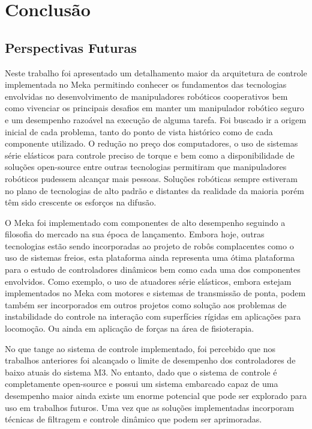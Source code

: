 \chapter{Conclusão} \label{ch:conclusoes}


\section{Perspectivas Futuras}

Neste trabalho foi apresentado um detalhamento maior da arquitetura de controle implementada no Meka permitindo conhecer os fundamentos das tecnologias envolvidas no desenvolvimento de manipuladores robóticos cooperativos bem como vivenciar os principais desafios em manter um manipulador robótico seguro e um desempenho razoável na execução de alguma tarefa. Foi buscado ir a origem inicial de cada problema, tanto do ponto de vista histórico como de cada componente utilizado. O redução no preço dos computadores, o uso de sistemas série elásticos para controle preciso de torque e bem como a disponibilidade de soluções open-source entre outras tecnologias permitiram que manipuladores robóticos pudessem alcançar mais pessoas. Soluções robóticas sempre estiveram no plano de tecnologias de alto padrão e distantes da realidade da maioria porém têm sido crescente os esforços na difusão.

O Meka foi implementado com componentes de alto desempenho seguindo a filosofia do mercado na sua época de lançamento. Embora hoje, outras tecnologias estão sendo incorporadas ao projeto de robôs complacentes como o uso de sistemas freios, esta plataforma ainda representa uma ótima plataforma para o estudo de controladores dinâmicos bem como cada uma dos componentes envolvidos. Como exemplo, o uso de atuadores série elásticos, embora estejam implementados no Meka com motores e sistemas de transmissão de ponta, podem também ser incorporados em outros projetos como solução aos problemas de instabilidade do controle na interação com superfícies rígidas em aplicações para locomoção. Ou ainda em aplicação de forças na área de fisioterapia.

No que tange ao sistema de controle implementado, foi percebido que nos trabalhos anteriores foi alcançado o limite de desempenho dos controladores de baixo atuais do sistema M3. No entanto, dado que o sistema de controle é completamente open-source e possui um sistema embarcado capaz de uma desempenho maior ainda existe um enorme potencial que pode ser explorado para uso em trabalhos futuros. Uma vez que as soluções implementadas incorporam técnicas de filtragem e controle dinâmico que podem ser aprimoradas.

